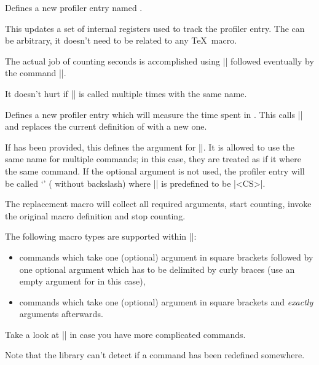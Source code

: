 \begin{command}{\pgfprofilenew{}}
	Defines a new profiler entry named .

	This updates a set of internal registers used to track the profiler entry. The  can be arbitrary, it doesn't need to be related to any \TeX\ macro.

	The actual job of counting seconds is accomplished using |\pgfprofilestart| followed eventually by the command |\pgfprofileend|.

	It doesn't hurt if |\pgfprofilenew| is called multiple times with the same name.
\end{command}

\begin{command}{\pgfprofilenewforcommand{}}
	Defines a new profiler entry which will measure the time spent in . This calls |\pgfprofilenew| and replaces the current definition of  with a new one. 
	
	If  has been provided, this defines the argument for |\pgfprofilenew|. It is allowed to use the same name for multiple commands; in this case, they are treated as if it where the same command. If the optional argument is not used, the profiler entry will be called `\declareandlabel{\pgfprofilecs}' ( without backslash) where |\pgfprofilecs| is predefined to be |<CS>|. 
	
	The replacement macro will collect all required arguments, start counting, invoke the original macro definition and stop counting.

	The following macro types are supported within |\pgfprofilenewforcommand|:
	\begin{itemize}
 \item commands which take one (optional) argument in square brackets
   followed by one optional argument which has to be delimited by
   curly braces (use an empty argument for  in this case),
 \item commands which take one (optional) argument in square brackets
   and \emph{exactly}  arguments afterwards.
	\end{itemize}

	Take a look at |\pgfprofilenewforcommandpattern| in case you have more complicated commands.


	Note that the library can't detect if a command has been redefined somewhere.
\end{command}

